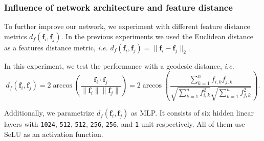 \subsubsection{Influence of network architecture and feature distance}


To further improve our network, we experiment with different feature distance metrics $d_f(\mathbf{f}_i,\mathbf{f}_j)$.
In the previous experiments we used the Euclidean distance as a features distance metric, \textit{i.e.} $d_f(\mathbf{f}_i,\mathbf{f}_j)=\lVert \mathbf{f}_i-\mathbf{f}_j\rVert_2$.

In this experiment, we test the performance with a geodesic distance, \textit{i.e.}
\begin{equation*}
    d_f(\mathbf{f}_i,\mathbf{f}_j) = 2 \arccos \left( \frac{\mathbf{f}_i \cdot \mathbf{f}_j}{\lVert \mathbf{f}_i \rVert \lVert \mathbf{f}_j \rVert} \right) = 2 \arccos \left( \frac{\sum_{k=1}^n f_{i,k} f_{j,k}}{\sqrt{\sum_{k=1}^n f_{i,k}^2}\sqrt{\sum_{k=1}^n f_{j,k}^2 }} \right).
    \label{eqn:geodesic-distance}
\end{equation*}

Additionally, we parametrize $d_f(\mathbf{f}_i,\mathbf{f}_j)$ as MLP. It consists of six hidden linear layers with \texttt{1024}, \texttt{512}, \texttt{512}, \texttt{256}, \texttt{256}, and \texttt{1} unit respectively. All of them use SeLU as an activation function.

